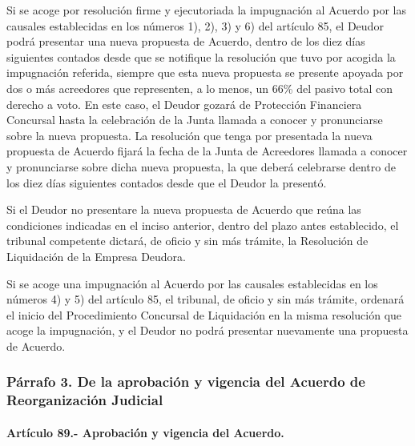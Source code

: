 \documentclass[
]{book}
\begin{document}
Si se acoge por resolución firme y ejecutoriada la impugnación al Acuerdo por las causales establecidas en los números 1), 2), 3) y 6) del artículo 85, el Deudor podrá presentar una nueva propuesta de Acuerdo, dentro de los diez días siguientes contados desde que se notifique la resolución que tuvo por acogida la impugnación referida, siempre que esta nueva propuesta se presente apoyada por dos o más acreedores que representen, a lo menos, un 66\% del pasivo total con derecho a voto. En este caso, el Deudor gozará de Protección Financiera Concursal hasta la celebración de la Junta llamada a conocer y pronunciarse sobre la nueva propuesta. La resolución que tenga por presentada la nueva propuesta de Acuerdo fijará la fecha de la Junta de Acreedores llamada a conocer y pronunciarse sobre dicha nueva propuesta, la que deberá celebrarse dentro de los diez días siguientes contados desde que el Deudor la presentó.

Si el Deudor no presentare la nueva propuesta de Acuerdo que reúna las condiciones indicadas en el inciso anterior, dentro del plazo antes establecido, el tribunal competente dictará, de oficio y sin más trámite, la Resolución de Liquidación de la Empresa Deudora.

Si se acoge una impugnación al Acuerdo por las causales establecidas en los números 4) y 5) del artículo 85, el tribunal, de oficio y sin más trámite, ordenará el inicio del Procedimiento Concursal de Liquidación en la misma resolución que acoge la impugnación, y el Deudor no podrá presentar nuevamente una propuesta de Acuerdo.

\hypertarget{puxe1rrafo-3.-de-la-aprobaciuxf3n-y-vigencia-del-acuerdo-de-reorganizaciuxf3n-judicial}{%
\subsubsection*{Párrafo 3. De la aprobación y vigencia del Acuerdo de Reorganización Judicial}\label{puxe1rrafo-3.-de-la-aprobaciuxf3n-y-vigencia-del-acuerdo-de-reorganizaciuxf3n-judicial}}

\hypertarget{artuxedculo-89.--aprobaciuxf3n-y-vigencia-del-acuerdo.}{%
\paragraph*{Artículo 89.- Aprobación y vigencia del Acuerdo.}\label{artuxedculo-89.--aprobaciuxf3n-y-vigencia-del-acuerdo.}}
\end{document}
